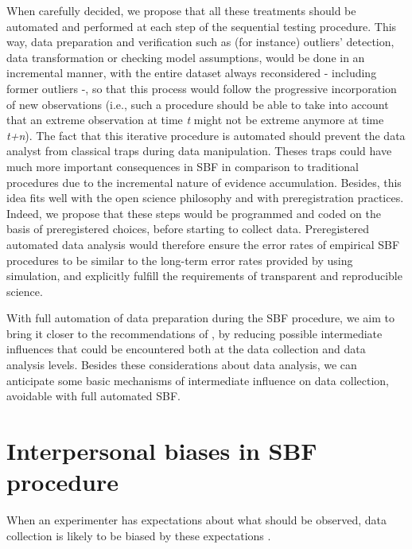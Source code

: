 \documentclass[a4paper,man,natbib,floatsintext,donotrepeattitle]{apa6}
\begin{document}
When carefully decided, we propose that all these treatments should be automated and performed at each step of the sequential testing procedure. This way, data preparation and verification such as (for instance) outliers' detection, data transformation or checking model assumptions, would be done in an incremental manner, with the entire dataset always reconsidered - including former outliers -, so that this process would follow the progressive incorporation of new observations (i.e., such a procedure should be able to take into account that an extreme observation at time \textit{t} might not be extreme anymore at time \textit{t+n}). The fact that this iterative procedure is automated should prevent the data analyst from classical traps during data manipulation. Theses traps could have much more important consequences in SBF in comparison to traditional procedures due to the incremental nature of evidence accumulation. Besides, this idea fits well with the open science philosophy and with preregistration practices. Indeed, we propose that these steps would be programmed and coded on the basis of preregistered choices, before starting to collect data. Preregistered automated data analysis would therefore ensure the error rates of empirical SBF procedures to be similar to the long-term error rates provided by \cite{schonbrodt_sequential_2017} using simulation, and explicitly fulfill the requirements of transparent and reproducible science. \par

With full automation of data preparation during the SBF procedure, we aim to bring it closer to the recommendations of \cite{schonbrodt_sequential_2017}, by reducing possible intermediate influences that could be encountered both at the data collection and data analysis levels. Besides these considerations about data analysis, we can anticipate some basic mechanisms of intermediate influence on data collection, avoidable with full automated SBF.

\section{Interpersonal biases in SBF procedure}

When an experimenter has expectations about what should be observed, data collection is likely to be biased by these expectations \citep{orne_social_1962,rosenthal_social_1963,rosenthal_experimenter_1964,rosenthal_interpersonal_1978,zoble_interaction_1969,klein_low_2012,gilder_role_2018}.
\end{document}
